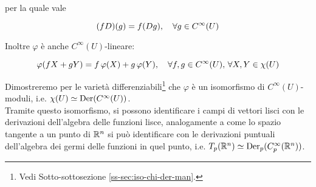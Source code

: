 per la quale vale

\begin{equation}
	(f D) (g) = f (D g) \qcomma \forall g \in C^{\infty}(U)
\end{equation}

Inoltre $ \varphi $ è anche $ C^{\infty}(U) $-lineare:

\begin{equation}
	\varphi(f X + g Y) = f \, \varphi(X) + g \, \varphi(Y) \qcomma \forall f, g \in C^{\infty}(U), \, \forall X, Y \in \chi(U)
\end{equation}

Dimostreremo per le varietà differenziabili\footnote{%
	Vedi Sotto-sottosezione \ref{ss-sec:iso-chi-der-man}.%
} che $ \varphi $ è un isomorfismo di $ C^{\infty}(U) $-moduli, i.e. $ \chi(U) \simeq \operatorname{Der}(C^{\infty}(U)) $. \\
Tramite questo isomorfismo, si possono identificare i campi di vettori lisci con le derivazioni dell'algebra delle funzioni lisce, analogamente a come lo spazio tangente a un punto di $ \mathbb{R}^{n} $ si può identificare con le derivazioni puntuali dell'algebra dei germi delle funzioni in quel punto, i.e. $ T_{p}(\mathbb{R}^{n}) \simeq \operatorname{Der}_{p}(C_{p}^{\infty}(\mathbb{R}^{n})) $.
